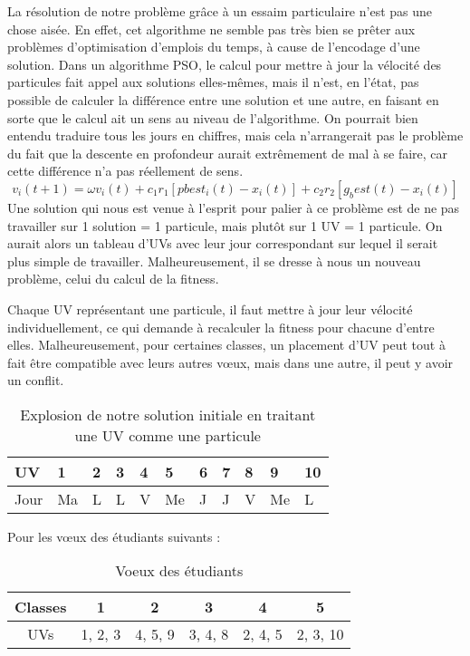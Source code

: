 
La résolution de notre problème grâce à un essaim particulaire n'est pas une chose aisée.
En effet, cet algorithme ne semble pas très bien se prêter aux problèmes d'optimisation d'emplois du temps, à cause de l'encodage d'une solution.
Dans un algorithme PSO, le calcul pour mettre à jour la vélocité des particules fait appel aux solutions elles-mêmes, mais il n'est, en l'état, pas possible de calculer la différence entre une solution et une autre, en faisant en sorte que le calcul ait un sens au niveau de l'algorithme.
On pourrait bien entendu traduire tous les jours en chiffres, mais cela n'arrangerait pas le problème du fait que la descente en profondeur aurait extrêmement de mal à se faire, car cette différence n'a pas réellement de sens.
$$v_i(t + 1) = \omega v_i(t) + c_1 r_1 [pbest_i(t) - x_i(t)] + c_2 r_2 [g_best(t) - x_i(t)]$$
Une solution qui nous est venue à l'esprit pour palier à ce problème est de ne pas travailler sur 1 solution = 1 particule, mais plutôt sur 1 UV = 1 particule.
On aurait alors un tableau d'UVs avec leur jour correspondant sur lequel il serait plus simple de travailler.
Malheureusement, il se dresse à nous un nouveau problème, celui du calcul de la fitness.

Chaque UV représentant une particule, il faut mettre à jour leur vélocité individuellement, ce qui demande à recalculer la fitness pour chacune d'entre elles.
Malheureusement, pour certaines classes, un placement d'UV peut tout à fait être compatible avec leurs autres v\oe ux, mais dans une autre, il peut y avoir un conflit.

\begin{table}[!h]
    \centering
    \begin{tabular}{|l|l|l|l|l|l|l|l|l|l|l|}
        \hline
        UV   & 1  & 2 & 3 & 4 & 5  & 6 & 7 & 8 & 9  & 10 \\
        \hline
        Jour & Ma & L & L & V & Me & J & J & V & Me & L  \\
        \hline
    \end{tabular}
    \caption{Explosion de notre solution initiale en traitant une UV comme une particule}\label{tab:particules}
\end{table}

Pour les v\oe ux des étudiants suivants :

\begin{table}[!h]
    \centering
    \begin{tabular}{|c|c|c|c|c|c|}
        \hline
        Classes & 1       & 2       & 3       & 4       & 5        \\
        \hline
        UVs     & 1, 2, 3 & 4, 5, 9 & 3, 4, 8 & 2, 4, 5 & 2, 3, 10 \\
        \hline
    \end{tabular}
    \caption{Voeux des étudiants}\label{tab:voeux-etudiant-particules}
\end{table}

